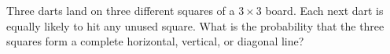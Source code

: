 Three darts land on three different squares of a $3\times3$ board. Each next dart is equally likely to hit any unused square. What is the probability that the three squares form a complete horizontal, vertical, or diagonal line?
